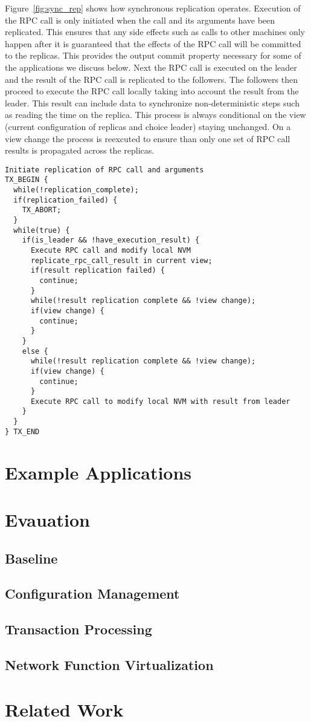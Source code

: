 \documentclass[twocolumn]{article}
\begin{document}
Figure~\ref{fig:sync_rep} shows how synchronous replication operates. Execution
of the RPC call is only initiated when the call and its arguments have been
replicated. This ensures that any side effects such as calls to other machines
only happen after it is guaranteed that the effects of the RPC call will be
committed to the replicas. This provides the output commit property necessary
for some of the applications we discuss below. Next the RPC call is executed on
the leader and the result of the RPC call is replicated to the followers. The
followers then proceed to execute the RPC call locally taking into account the
result from the leader. This result can include data to synchronize
non-deterministic steps such as reading the time on the replica. This process is
always conditional on the view (current configuration of replicas and choice
leader) staying unchanged. On a view change the process is reexcuted to ensure
than only one set of RPC call results is propagated across the replicas. 

\begin{figure*}
{ \scriptsize
\begin{verbatim}
Initiate replication of RPC call and arguments
TX_BEGIN {
  while(!replication_complete);
  if(replication_failed) {
    TX_ABORT;
  }  
  while(true) {
    if(is_leader && !have_execution_result) {
      Execute RPC call and modify local NVM
      replicate_rpc_call_result in current view;
      if(result replication failed) {
        continue;
      }
      while(!result replication complete && !view change);
      if(view change) {
        continue;
      }
    }
    else {
      while(!result replication complete && !view change);
      if(view change) {
        continue;
      }
      Execute RPC call to modify local NVM with result from leader
    }
  }
} TX_END
\end{verbatim}
}
\caption{Synchronous Replication}
\label{fig:sync_rep}
\end{figure*}


\section{Example Applications}
\label{sec:examples}

\section{Evauation}

\subsection{Baseline}

\subsection{Configuration Management}

\subsection{Transaction Processing}

\subsection{Network Function Virtualization}

\section{Related Work}
\end{document}
